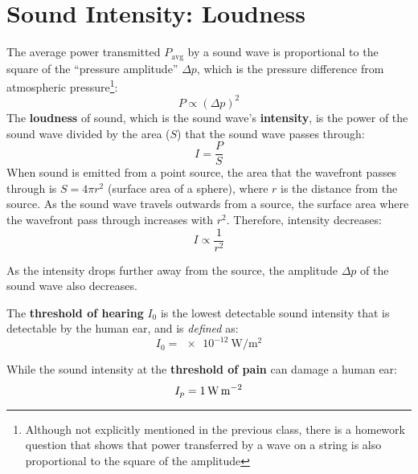 \section{Sound Intensity: Loudness}

The average power transmitted $P_\text{avg}$ by a sound wave is proportional
to the square of the ``pressure amplitude'' $\Delta p$, which is the pressure
difference from atmospheric pressure\footnote{Although not explicitly
mentioned in the previous class, there is a homework question that shows
that power transferred by a wave on a string is also proportional to the
square of the amplitude}:
\begin{equation}
  P\propto(\Delta p)^2
\end{equation}
The \textbf{loudness} of sound, which is the sound wave's \textbf{intensity},
is the power of the sound wave divided by the area ($S$) that the sound wave
passes through:
\begin{equation}
  \boxed{I=\frac PS}%
\end{equation}
When sound is emitted from a point source, the area that the wavefront passes
through is $S=4\pi r^2$ (surface area of a sphere), where $r$ is the distance
from the source. As the sound wave travels outwards from a source, the surface
area where the  wavefront pass through increases with $r^2$. Therefore,
intensity decreases:
\begin{equation}
  I\propto\frac1{r^2}
\end{equation}

As the intensity drops further away from the source, the amplitude $\Delta p$
of the sound wave also decreases.


The \textbf{threshold of hearing} $I_0$ is the lowest detectable sound
intensity that is detectable by the human ear, and is \emph{defined} as:
\begin{equation*}
  I_0=\SI{e-12}{\watt\per\metre\squared}
\end{equation*}
  
While the sound intensity at the \textbf{threshold of pain} can damage a human
ear:
\begin{equation*}
  I_p=\SI1{\watt\per\metre\squared}
\end{equation*}



